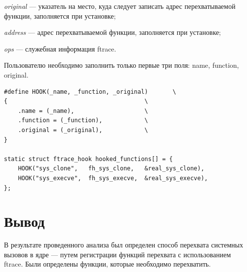 \textit{original} ---  указатель на место, куда следует записать адрес перехватываемой функции, заполняется при установке;

\textit{address} --- адрес перехватываемой функции, заполняется при установке;

\textit{ops} --- служебная информация ftrace.

Пользователю необходимо заполнить только первые три поля: name, function, original. 

\begin{lstlisting}[label=code:ftracehookexm,caption=Пример заполнения структуры ftrace\_hook]
#define HOOK(_name, _function, _original)       \
{                                       \
	.name = (_name),                    \
	.function = (_function),            \
	.original = (_original),            \
}

static struct ftrace_hook hooked_functions[] = {
	HOOK("sys_clone",   fh_sys_clone,   &real_sys_clone),
	HOOK("sys_execve",  fh_sys_execve,  &real_sys_execve),
};
\end{lstlisting}



\section*{Вывод}

В результате проведенного анализа был определен способ перехвата системных вызовов в ядре --- путем регистрации функций перехвата с использованием ftrace. Были определены функции, которые необходимо перехватить.